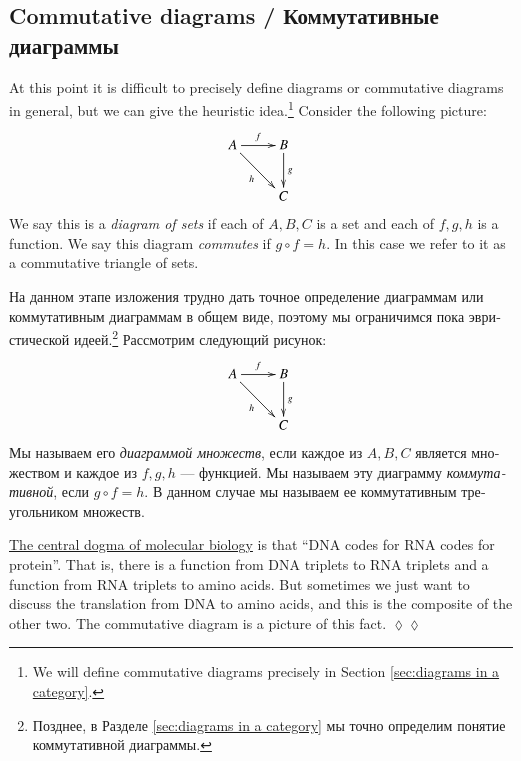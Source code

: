 \documentclass[a4paper]{book}
\def\Set{{\bf Set}}
\theoremstyle{myth}
\newtheorem{appENG}[envENG]{\begin{english}Application\end{english}}
\newenvironment{applicationENG}{\begin{appENG}}{\hspace*{\fill}$\lozenge\lozenge$\end{appENG}}
\begin{document}
\begin{russian}

\section{Commutative diagrams / Коммутативные диаграммы}\label{sec:comm diag}
\addtocounter{subsection}{1}\setcounter{subsubsection}{0}

At this point it is difficult to precisely define diagrams or commutative diagrams in general, but we can give the heuristic idea.\footnote{We will define commutative diagrams precisely in Section \ref{sec:diagrams in a category}.}
Consider the following picture: 
\begin{align}\label{dia:triangle}
\xymatrix{A\ar[r]^f\ar[rd]_h&B\ar[d]^g\\&C}
\end{align}
We say this is a {\em diagram of sets}\index{diagram!in $\Set$} if each of $A,B,C$ is a set and each of $f,g,h$ is a function. We say this diagram {\em commutes} if $g\circ f = h$. In this case we refer to it as a commutative triangle of sets.

На данном этапе изложения трудно дать точное определение диаграммам или коммутативным диаграммам в общем виде, поэтому мы ограничимся пока эвристической идеей.\footnote{Позднее, в Разделе \ref{sec:diagrams in a category} мы точно определим понятие коммутативной диаграммы.}
Рассмотрим следующий рисунок: 
\begin{align}\label{dia:triangle}
\xymatrix{A\ar[r]^f\ar[rd]_h&B\ar[d]^g\\&C}
\end{align}
Мы называем его {\em диаграммой множеств}\index{диаграмма!в $\Set$}, если каждое из $A,B,C$ является множеством и каждое из $f,g,h$ — функцией. Мы называем эту диаграмму {\em коммутативной}, если $g\circ f = h$. В данном случае мы называем ее коммутативным треугольником множеств.

\begin{applicationENG}
\href{http://en.wikipedia.org/wiki/Central_dogma_of_molecular_biology}{\text The central dogma of molecular biology} is that “DNA codes for RNA codes for protein”. That is, there is a function from DNA triplets to RNA triplets and a function from RNA triplets to amino acids. But sometimes we just want to discuss the translation from DNA to amino acids, and this is the composite of the other two. The commutative diagram is a picture of this fact.
\end{applicationENG}


\end{russian}
\end{document}

